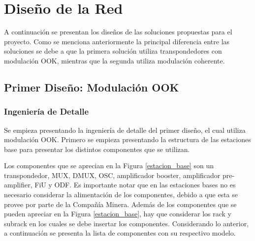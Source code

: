 \documentclass[letterpaper,11pt]{article} %
\begin{document}
\newpage
\section{Diseño de la Red}

A continuación se presentan los diseños de las soluciones propuestas para el proyecto. Como se menciona anteriormente la principal diferencia entre las soluciones se debe a que la primera solución utiliza transpondedores con modulación OOK, mientras que la segunda utiliza modulación coherente.

\subsection{Primer Diseño: Modulación OOK}

\subsubsection{Ingeniería de Detalle}

Se empieza presentando la ingeniería de detalle del primer diseño, el cual utiliza modulación OOK. Primero se empieza presentando la estructura de las estaciones base para presentar los distintos componentes que se utilizan.


\newp
Los componentes que se aprecian en la Figura \ref{estacion_base} son un transpondedor, MUX, DMUX, OSC, amplificador booster, amplificador pre-amplifier, FiU y ODF. Es importante notar que en las estaciones bases no es necesario considerar la alimentación de los componentes, debido a que esta se provee por parte de la Compañía Minera. Además de los componentes que se pueden apreciar en la Figura \ref{estacion_base}, hay que considerar los rack y subrack en los cuales se debe insertar los componentes. Considerando lo anterior, a continuación se presenta la lista de componentes con su respectivo modelo.
\end{document}
